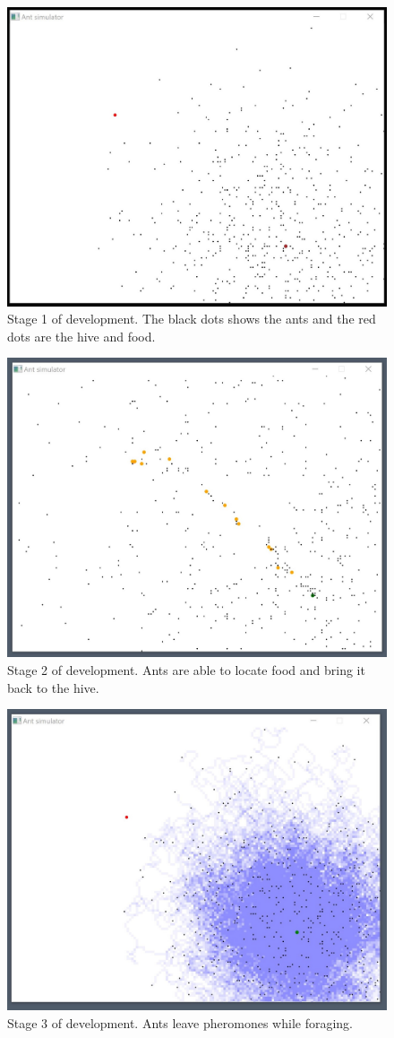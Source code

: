 \documentclass[a4paper, oneside, 11pt]{report}
\begin{document}
\begin{figure}[htb]
	\begin{center}
		\includegraphics[width=0.65 \columnwidth]{Stage_1.jpg}
		\caption{Stage 1 of development. The black dots shows the ants and the red dots are the hive and food.}
		\label{fig:Stage 1}
	\end{center}
\end{figure}

\begin{figure}[htb]
	\begin{center}
		\includegraphics[width=0.65 \columnwidth]{Stage_2.jpg}
		\caption{Stage 2 of development. Ants are able to locate food and bring it back to the hive.}
		\label{fig:Stage 2}
	\end{center}
\end{figure}

\begin{figure}[htb]
	\begin{center}
		\includegraphics[width=0.65 \columnwidth]{Stage_3.jpg}
		\caption{Stage 3 of development. Ants leave pheromones while foraging.}
		\label{fig:Stage 3}
	\end{center}
\end{figure}
\end{document}
